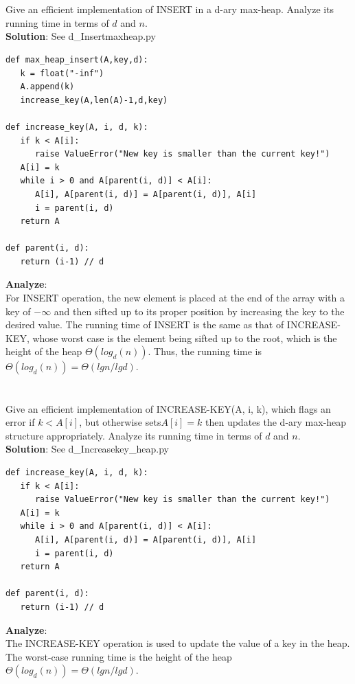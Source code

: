 \documentclass[UTF8]{ctexart}
\begin{document}
\section{}
Give an efficient implementation of INSERT in a d-ary max-heap. Analyze its running time in terms of $d$ and $n$.\\
\textbf{Solution}: See d\_Insertmaxheap.py
\begin{lstlisting}
def max_heap_insert(A,key,d):
   k = float("-inf")
   A.append(k)
   increase_key(A,len(A)-1,d,key)

def increase_key(A, i, d, k):
   if k < A[i]:
      raise ValueError("New key is smaller than the current key!")
   A[i] = k
   while i > 0 and A[parent(i, d)] < A[i]:
      A[i], A[parent(i, d)] = A[parent(i, d)], A[i]
      i = parent(i, d)
   return A
   
def parent(i, d):
   return (i-1) // d
\end{lstlisting}
\textbf{Analyze}:\\
For INSERT operation, the new element is placed at the end of the array with a key of $-\infty$
and then sifted up to its proper position by increasing the key to the desired value.
The running time of INSERT is the same as that of INCREASE-KEY, whose worst case is the element being sifted up to the root, which is the height of the heap $\Theta(log_d(n))$.
Thus, the running time is $\Theta(log_d(n)) = \Theta(lgn/lgd)$.

\section{}
Give an efficient implementation of INCREASE-KEY(A, i, k), which flags
an error if $k < A[i]$, but otherwise sets$ A[i]=k$ then updates the d-ary max-heap
structure appropriately. Analyze its running time in terms of $d$ and $n$.\\
\textbf{Solution}: See d\_Increasekey\_heap.py
\begin{lstlisting}
def increase_key(A, i, d, k):
   if k < A[i]:
      raise ValueError("New key is smaller than the current key!")
   A[i] = k
   while i > 0 and A[parent(i, d)] < A[i]:
      A[i], A[parent(i, d)] = A[parent(i, d)], A[i]
      i = parent(i, d)
   return A
   
def parent(i, d):
   return (i-1) // d
\end{lstlisting}
\textbf{Analyze}:\\
The INCREASE-KEY operation is used to update the value of a key in the heap. The worst-case running time is the height of the heap $\Theta(log_d(n)) = \Theta(lgn/lgd)$.
\end{document}
